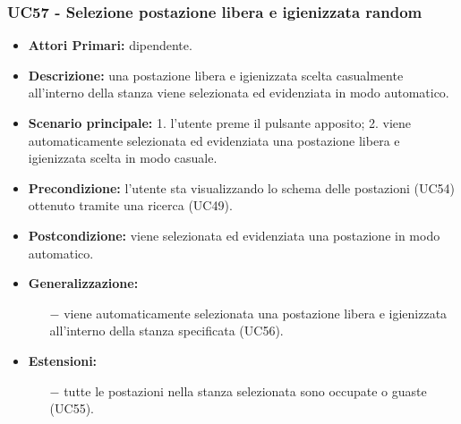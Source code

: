 \subsubsection{ UC57 - Selezione postazione libera e igienizzata random}
\begin{itemize}
	\item\textbf{Attori Primari:} dipendente.
	\item\textbf{Descrizione:} una postazione libera e igienizzata scelta casualmente all'interno della stanza viene selezionata ed evidenziata in modo automatico.
	\item\textbf{Scenario principale:}
	1. l'utente preme il pulsante apposito;
	2. viene automaticamente selezionata ed evidenziata una postazione libera e igienizzata scelta in modo casuale.
	\item\textbf{Precondizione:} l’utente sta visualizzando lo schema delle postazioni (UC54) ottenuto tramite una ricerca (UC49).
	\item\textbf{Postcondizione:} viene selezionata ed evidenziata una postazione in modo automatico.
	\item\textbf{Generalizzazione:}
	\begin{itemize}
		\item[$-$] viene automaticamente selezionata una postazione libera e igienizzata all'interno della stanza specificata (UC56).
	\end{itemize}
	\item\textbf{Estensioni:}
	\begin{itemize}
		\item[$-$] tutte le postazioni nella stanza selezionata sono occupate o guaste (UC55).
	\end{itemize}
\end{itemize}
